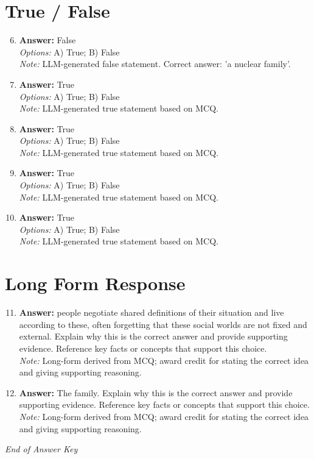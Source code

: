 \documentclass[12pt]{article}
\begin{document}
\section*{True / False}
\begin{enumerate}[label=\arabic*.]
\setcounter{enumi}{5}
\item \textbf{Answer:} False
\\ \textit{Options:} A) True; B) False
\\ \textit{Note:} LLM-generated false statement. Correct answer: 'a nuclear family'.
\item \textbf{Answer:} True
\\ \textit{Options:} A) True; B) False
\\ \textit{Note:} LLM-generated true statement based on MCQ.
\item \textbf{Answer:} True
\\ \textit{Options:} A) True; B) False
\\ \textit{Note:} LLM-generated true statement based on MCQ.
\item \textbf{Answer:} True
\\ \textit{Options:} A) True; B) False
\\ \textit{Note:} LLM-generated true statement based on MCQ.
\item \textbf{Answer:} True
\\ \textit{Options:} A) True; B) False
\\ \textit{Note:} LLM-generated true statement based on MCQ.
\end{enumerate}

\section*{Long Form Response}
\begin{enumerate}[label=\arabic*.]
\setcounter{enumi}{10}
\item \textbf{Answer:} people negotiate shared definitions of their situation and live according to these, often forgetting that these social worlds are not fixed and external. Explain why this is the correct answer and provide supporting evidence. Reference key facts or concepts that support this choice.
\\ \textit{Note:} Long-form derived from MCQ; award credit for stating the correct idea and giving supporting reasoning.
\item \textbf{Answer:} The family. Explain why this is the correct answer and provide supporting evidence. Reference key facts or concepts that support this choice.
\\ \textit{Note:} Long-form derived from MCQ; award credit for stating the correct idea and giving supporting reasoning.
\end{enumerate}

\vfill
\noindent\textit{End of Answer Key}
\end{document}
